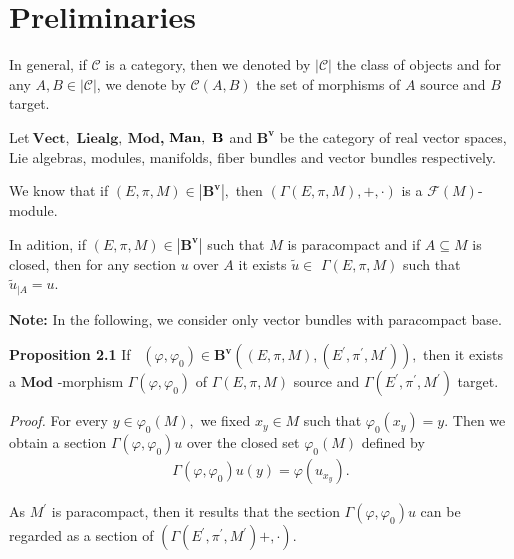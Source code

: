 \documentclass[11pt]{article}
\begin{document}
\section{Preliminaries}

In general, if $\mathcal{C}$ is a category, then we denoted by $\left\vert
\mathcal{C}\right\vert $ the class of objects and for any $A,B{\in }%
\left\vert \mathcal{C}\right\vert $, we denote by $\mathcal{C}\left(
A,B\right) $ the set of morphisms of $A$ source and $B$ target.

Let$\mathbf{~Vect},$ $\mathbf{Liealg},~\mathbf{Mod}$\textbf{,} $\mathbf{%
Man,~B}$ and $\mathbf{B}^{\mathbf{v}}$ be the category of real vector
spaces, Lie algebras, modules, manifolds, fiber bundles and vector bundles
respectively.

We know that if $\left( E,\pi ,M\right) \in \left\vert \mathbf{B}^{\mathbf{v}%
}\right\vert ,$ then $\left( \Gamma \left( E,\pi ,M\right) ,+,\cdot \right) $
is a $\mathcal{F}\left( M\right) $-module.

In adition, if $\left( E,\pi ,M\right) \in \left\vert \mathbf{B}^{\mathbf{v}%
}\right\vert $ such that $M$ is paracompact and if $A\subseteq M$ is closed,
then for any section $u$ over $A$ it exists $\tilde{u}\in $ $\Gamma \left(
E,\pi ,M\right) $ such that $\tilde{u}_{|A}=u.$

\textbf{Note: }In the following, we consider only vector bundles with
paracompact base.

\textbf{Proposition 2.1 }If \ $\left( \varphi ,\varphi _{0}\right) \in
\mathbf{B}^{\mathbf{v}}\left( \left( E,\pi ,M\right) ,\left( E^{\prime },\pi
^{\prime },M^{\prime }\right) \right) ,$ then it exists a $\mathbf{Mod}$%
-morphism $\Gamma \left( \varphi ,\varphi _{0}\right) $ of $\Gamma \left(
E,\pi ,M\right) $ source and $\Gamma \left( E^{\prime },\pi ^{\prime
},M^{\prime }\right) $ target.

\emph{Proof. }For every $y\in \varphi _{0}\left( M\right) ,$ we fixed $%
x_{y}\in M$ such that $\varphi _{0}\left( x_{y}\right) =y.$ Then we obtain a
section $\Gamma \left( \varphi ,\varphi _{0}\right) u$ over the closed set $%
\varphi _{0}\left( M\right) $ defined by
\begin{equation*}
\begin{array}{c}
\Gamma \left( \varphi ,\varphi _{0}\right) u\left( y\right) =\varphi \left(
u_{x_{y}}\right) .%
\end{array}%
\end{equation*}

As $M^{\prime }$ is paracompact, then it results that the section $\Gamma
\left( \varphi ,\varphi _{0}\right) u$ can be regarded as a section of $%
\left( \Gamma \left( E^{\prime },\pi ^{\prime },M^{\prime }\right) +,\cdot
\right) $.\hfill
\end{document}
